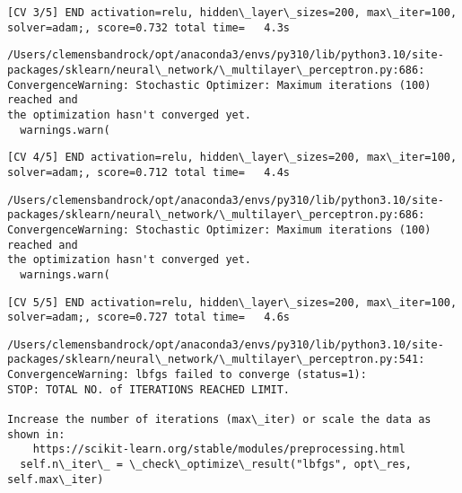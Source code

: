 \documentclass[11pt]{article}
\begin{document}
    \begin{Verbatim}[commandchars=\\\{\}]
[CV 3/5] END activation=relu, hidden\_layer\_sizes=200, max\_iter=100,
solver=adam;, score=0.732 total time=   4.3s
    \end{Verbatim}

    \begin{Verbatim}[commandchars=\\\{\}]
/Users/clemensbandrock/opt/anaconda3/envs/py310/lib/python3.10/site-
packages/sklearn/neural\_network/\_multilayer\_perceptron.py:686:
ConvergenceWarning: Stochastic Optimizer: Maximum iterations (100) reached and
the optimization hasn't converged yet.
  warnings.warn(
    \end{Verbatim}

    \begin{Verbatim}[commandchars=\\\{\}]
[CV 4/5] END activation=relu, hidden\_layer\_sizes=200, max\_iter=100,
solver=adam;, score=0.712 total time=   4.4s
    \end{Verbatim}

    \begin{Verbatim}[commandchars=\\\{\}]
/Users/clemensbandrock/opt/anaconda3/envs/py310/lib/python3.10/site-
packages/sklearn/neural\_network/\_multilayer\_perceptron.py:686:
ConvergenceWarning: Stochastic Optimizer: Maximum iterations (100) reached and
the optimization hasn't converged yet.
  warnings.warn(
    \end{Verbatim}

    \begin{Verbatim}[commandchars=\\\{\}]
[CV 5/5] END activation=relu, hidden\_layer\_sizes=200, max\_iter=100,
solver=adam;, score=0.727 total time=   4.6s
    \end{Verbatim}

    \begin{Verbatim}[commandchars=\\\{\}]
/Users/clemensbandrock/opt/anaconda3/envs/py310/lib/python3.10/site-
packages/sklearn/neural\_network/\_multilayer\_perceptron.py:541:
ConvergenceWarning: lbfgs failed to converge (status=1):
STOP: TOTAL NO. of ITERATIONS REACHED LIMIT.

Increase the number of iterations (max\_iter) or scale the data as shown in:
    https://scikit-learn.org/stable/modules/preprocessing.html
  self.n\_iter\_ = \_check\_optimize\_result("lbfgs", opt\_res, self.max\_iter)
    \end{Verbatim}
\end{document}
